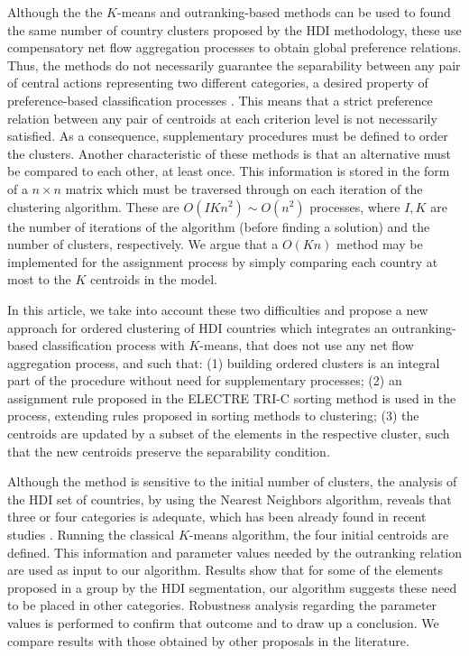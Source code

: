 \documentclass[]{elsarticle}
\theoremstyle{definition}
\begin{document}
Although the the $K$-means and outranking-based methods can be used to found the same number of country clusters proposed by the HDI methodology, these use compensatory net flow aggregation processes to obtain global preference relations. Thus, the methods do not necessarily guarantee the separability between any pair of central actions representing two different categories, a desired property of preference-based classification processes \citep{roy2012}. This means that a strict preference relation between any pair of centroids at each criterion level is not necessarily satisfied. As a consequence, supplementary procedures must be defined to order the clusters.  Another characteristic of these methods is that an alternative must be compared to each other, at least once. This information is stored in the form of a $n \times n$ matrix which must be traversed through on each iteration of the clustering algorithm. These are $O(IKn^2) \sim O(n^2)$ processes, where $I, K$ are the number of iterations of the algorithm (before finding a solution) and the number of clusters, respectively. We argue that a $O(Kn)$ method may be implemented for the assignment process by simply comparing each country at most to the $K$ centroids in the model.  

In this article, we take into account these two difficulties and propose a new approach for ordered clustering of HDI countries which integrates an outranking-based classification process with $K$-means, that does not use any net flow aggregation process, and such that:  (1) building ordered clusters is an integral part of the procedure without need for supplementary processes; (2)  an assignment rule proposed in the ELECTRE TRI-C sorting method \citep{almeida2008,Almeida2012} is used in the process, extending rules proposed in sorting methods to clustering; (3) the centroids are updated by a subset of the elements in the respective cluster, such that the new centroids preserve the separability condition.  

Although the method is sensitive to the initial number of clusters, the analysis of the HDI set of countries, by using the Nearest Neighbors algorithm, reveals that three or four categories is adequate, which has been already found in recent studies \citep{doCarvalhalMonteiro2018}.  Running the classical $K$-means algorithm, the four initial centroids are defined.  This information and parameter values needed by the outranking relation are used as input to our algorithm.  Results show that for some of the elements proposed in a group by the HDI segmentation, our algorithm suggests these need to be placed in other categories.  Robustness analysis regarding the parameter values is performed to confirm that outcome and to draw up a conclusion.  We compare results with those obtained by other proposals in the literature.
\end{document}
